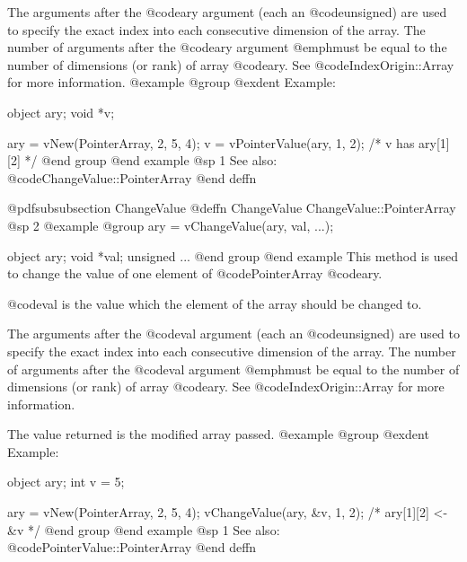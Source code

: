 The arguments after the @code{ary} argument (each an @code{unsigned})
are used to specify the exact index into each consecutive dimension of
the array.  The number of arguments after the @code{ary} argument
@emph{must} be equal to the number of dimensions (or rank) of array
@code{ary}.  See @code{IndexOrigin::Array} for more information.
@example
@group
@exdent Example:

object  ary;
void    *v;

ary = vNew(PointerArray, 2, 5, 4);
v = vPointerValue(ary, 1, 2);
/*  v has ary[1][2]  */
@end group
@end example
@sp 1
See also:  @code{ChangeValue::PointerArray}
@end deffn








@pdfsubsubsection {ChangeValue}
@deffn {ChangeValue} ChangeValue::PointerArray
@sp 2
@example
@group
ary = vChangeValue(ary, val, ...);

object    ary;
void     *val;
unsigned  ...
@end group
@end example
This method is used to change the value of one element of
@code{PointerArray} @code{ary}.

@code{val} is the value which the element of the array should be changed
to.

The arguments after the @code{val} argument (each an @code{unsigned})
are used to specify the exact index into each consecutive dimension of
the array.  The number of arguments after the @code{val} argument
@emph{must} be equal to the number of dimensions (or rank) of array
@code{ary}.  See @code{IndexOrigin::Array} for more information.

The value returned is the modified array passed.
@example
@group
@exdent Example:

object  ary;
int     v = 5;

ary = vNew(PointerArray, 2, 5, 4);
vChangeValue(ary, &v, 1, 2);
/*  ary[1][2] <- &v  */
@end group
@end example
@sp 1
See also:  @code{PointerValue::PointerArray}
@end deffn




